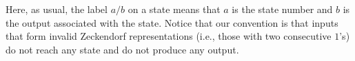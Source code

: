 \documentclass[12pt,runningheads]{llncs}
\newcommand{\tO}{\mathtt{0}}
\newcommand{\tL}{\mathtt{1}}
\begin{document}








Here, as usual, the label $a/b$ on a state means that $a$ is the state number and $b$ is the output associated with the state.
Notice that our convention is that inputs that form invalid Zeckendorf representations (i.e., those with two consecutive $1$'s) do not reach any state and do not produce any output.  
\end{document}
